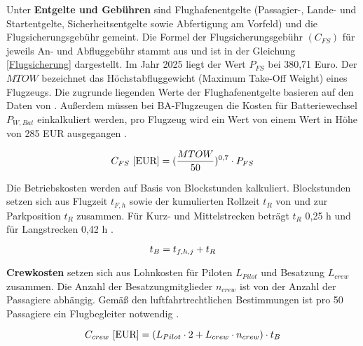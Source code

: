 Unter \textbf{Entgelte und Gebühren} sind Flughafenentgelte (Passagier-, Lande- und Startentgelte, Sicherheitsentgelte sowie Abfertigung am 
Vorfeld) und die Flugsicherungsgebühr gemeint. 
Die Formel der Flugsicherungsgebühr $(C_{FS})$ für jeweils An- und Abfluggebühr stammt aus \cite{dfs_flugsicherungsgebuehren} und ist in der Gleichung \eqref{Flugsicherung}
dargestellt. Im Jahr 2025 liegt der Wert $P_{FS}$ bei 380,71 Euro. 
Der $MTOW$ bezeichnet das Höchstabfluggewicht (Maximum Take-Off Weight) eines Flugzeugs. 
Die zugrunde liegenden Werte der Flughafenentgelte basieren auf den Daten von \cite{fraport2025entgelte}.
Außerdem müssen bei BA-Flugzeugen die Kosten für
Batteriewechsel $P_{W,Bat}$ einkalkuliert werden, pro Flugzeug wird ein Wert von einem Wert in Höhe von 285 EUR ausgegangen \cite{guo2023infrastructure}.

\begin{equation}
   {C_{FS} ~[\text{EUR}]} = (\frac{MTOW}{50})^{0,7} \cdot P_{FS} \\
   \label{Flugsicherung}
\end{equation}

Die Betriebskosten werden auf Basis von Blockstunden kalkuliert. 
Blockstunden setzen sich aus Flugzeit $t_{F,h}$ sowie der kumulierten Rollzeit $t_{R}$ von und zur Parkposition $t_{R}$ zusammen. 
Für Kurz- und Mittelstrecken beträgt $t_{R}$ {0,25 h} und für Langstrecken 0,42 h \cite{scholz_design_evaluation_doc}.

\begin{equation}
   t_{B} = t_{f,h,j} + t_{R} \\
   \label{blockzeit}
\end{equation}

\textbf{Crewkosten} setzen sich aus Lohnkosten für Piloten $L_{Pilot}$ und Besatzung $L_{crew}$ zusammen. Die Anzahl der Besatzungmitglieder $n_{crew}$ ist 
von der Anzahl der Passagiere abhängig. Gemäß den luftfahrtrechtlichen Bestimmungen ist pro 50 Passagiere ein Flugbegleiter notwendig \cite{conrady2019luftverkehr}.

\begin{equation}
   {C_{crew} ~[\text{EUR}]} = ({L}_{Pilot} \cdot 2 + {L}_{crew} \cdot n_{crew} ) \cdot t_{B} \\
   \label{crew cost}
\end{equation}





